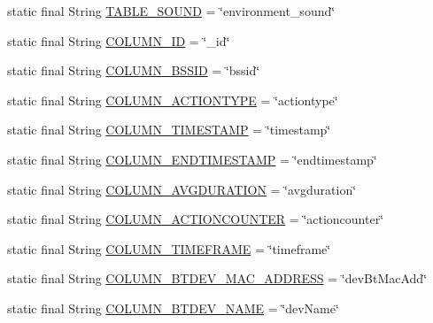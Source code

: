 \begin{DoxyCompactItemize}
\item 
static final String \hyperlink{classcs_1_1usense_1_1db_1_1_usense_s_q_lite_helper_abdc4b928a3f27481d62118b39001c7d2}{T\+A\+B\+L\+E\+\_\+\+S\+O\+U\+N\+D} = \char`\"{}environment\+\_\+sound\char`\"{}
\item 
static final String \hyperlink{classcs_1_1usense_1_1db_1_1_usense_s_q_lite_helper_ac0c4ad3a273f5adda9bdfc60e679379d}{C\+O\+L\+U\+M\+N\+\_\+\+I\+D} = \char`\"{}\+\_\+id\char`\"{}
\item 
static final String \hyperlink{classcs_1_1usense_1_1db_1_1_usense_s_q_lite_helper_ac1ad236c661ce308ab97a6053ddff2f8}{C\+O\+L\+U\+M\+N\+\_\+\+B\+S\+S\+I\+D} = \char`\"{}bssid\char`\"{}
\item 
static final String \hyperlink{classcs_1_1usense_1_1db_1_1_usense_s_q_lite_helper_a4a0884baf404d0890424a74ec2e908e7}{C\+O\+L\+U\+M\+N\+\_\+\+A\+C\+T\+I\+O\+N\+T\+Y\+P\+E} = \char`\"{}actiontype\char`\"{}
\item 
static final String \hyperlink{classcs_1_1usense_1_1db_1_1_usense_s_q_lite_helper_a2887e35fa45755fe0b1d335cf79e4895}{C\+O\+L\+U\+M\+N\+\_\+\+T\+I\+M\+E\+S\+T\+A\+M\+P} = \char`\"{}timestamp\char`\"{}
\item 
static final String \hyperlink{classcs_1_1usense_1_1db_1_1_usense_s_q_lite_helper_a5293e9bfb95dac32ba06d01a9554cb6d}{C\+O\+L\+U\+M\+N\+\_\+\+E\+N\+D\+T\+I\+M\+E\+S\+T\+A\+M\+P} = \char`\"{}endtimestamp\char`\"{}
\item 
static final String \hyperlink{classcs_1_1usense_1_1db_1_1_usense_s_q_lite_helper_aa72cff6cb63d934c873f3b1b9a89093f}{C\+O\+L\+U\+M\+N\+\_\+\+A\+V\+G\+D\+U\+R\+A\+T\+I\+O\+N} = \char`\"{}avgduration\char`\"{}
\item 
static final String \hyperlink{classcs_1_1usense_1_1db_1_1_usense_s_q_lite_helper_ac48d2caf493742fb1cc8146259593f42}{C\+O\+L\+U\+M\+N\+\_\+\+A\+C\+T\+I\+O\+N\+C\+O\+U\+N\+T\+E\+R} = \char`\"{}actioncounter\char`\"{}
\item 
static final String \hyperlink{classcs_1_1usense_1_1db_1_1_usense_s_q_lite_helper_aa94ebf764ce6581ae3866f82e4ac4bda}{C\+O\+L\+U\+M\+N\+\_\+\+T\+I\+M\+E\+F\+R\+A\+M\+E} = \char`\"{}timeframe\char`\"{}
\item 
static final String \hyperlink{classcs_1_1usense_1_1db_1_1_usense_s_q_lite_helper_a88746e54f676544fb8a10c6e2fd5843b}{C\+O\+L\+U\+M\+N\+\_\+\+B\+T\+D\+E\+V\+\_\+\+M\+A\+C\+\_\+\+A\+D\+D\+R\+E\+S\+S} = \char`\"{}dev\+Bt\+Mac\+Add\char`\"{}
\item 
static final String \hyperlink{classcs_1_1usense_1_1db_1_1_usense_s_q_lite_helper_a85cd491dd37f27b29083f6c04c169246}{C\+O\+L\+U\+M\+N\+\_\+\+B\+T\+D\+E\+V\+\_\+\+N\+A\+M\+E} = \char`\"{}dev\+Name\char`\"{}

\end{DoxyCompactItemize}
